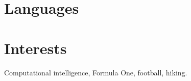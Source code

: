 \medskip
\nocite{*}
\renewcommand{\bibliographyitemlabel}{[\arabic{enumiv}]}

\begin{flushleft}

\end{flushleft}


\medskip
\section{Languages}


\medskip
\section{Interests}

\cvline
    {}{Computational intelligence, Formula One, football, hiking.}


